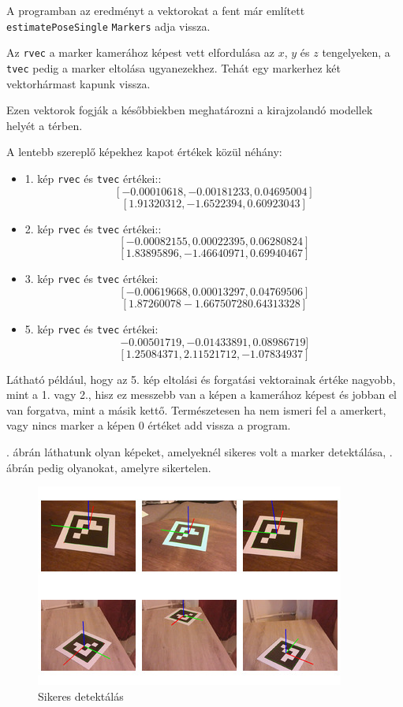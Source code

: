 A programban az eredményt a vektorokat a fent már említett \texttt{estimatePoseSingle} \texttt{Markers} adja vissza.

Az \texttt{rvec} a marker kamerához képest vett elfordulása az $x$, $y$ és $z$ tengelyeken, a \texttt{tvec} pedig a marker eltolása ugyanezekhez. Tehát egy markerhez két vektorhármast kapunk vissza.

Ezen vektorok fogják a későbbiekben meghatározni a kirajzolandó modellek helyét a térben.

A lentebb szereplő képekhez kapot értékek közül néhány:
\begin{itemize}
\item 1. kép \texttt{rvec} és \texttt{tvec} értékei::
\[[-0.00010618, -0.00181233, 0.04695004]\]
\[[ 1.91320312, -1.6522394,  0.60923043]\]
\item 2. kép \texttt{rvec} és \texttt{tvec} értékei::
\[[-0.00082155,  0.00022395,  0.06280824]\]
\[[ 1.83895896, -1.46640971,  0.69940467]\]
\item 3. kép \texttt{rvec} és \texttt{tvec} értékei:
\[[-0.00619668, 0.00013297,  0.04769506]\]
\[[ 1.87260078 -1.66750728  0.64313328]\]
\item 5. kép \texttt{rvec} és \texttt{tvec} értékei:
\[-0.00501719, -0.01433891,  0.08986719]\]
\[[ 1.25084371,  2.11521712, -1.07834937]\]
\end{itemize}

Látható például, hogy az 5. kép eltolási és forgatási vektorainak értéke nagyobb, mint a 1. vagy 2., hisz ez messzebb van a képen a kamerához képest és jobban el van forgatva, mint a másik kettő.
Természetesen ha nem ismeri fel a amerkert, vagy nincs marker a képen 0 értéket add vissza a program.

. ábrán láthatunk olyan képeket, amelyeknél sikeres volt a marker detektálása, . ábrán pedig olyanokat, amelyre sikertelen.

\begin{figure}[htp]
    \centering
   	\includegraphics[width=\textwidth]{images/detect.jpg}
	\caption{Sikeres detektálás}
	\label{fig:detect}
\end{figure}

